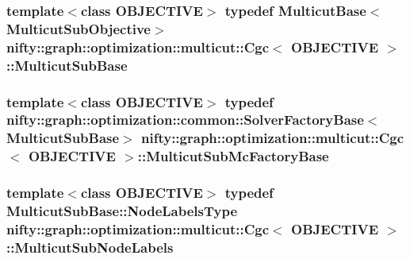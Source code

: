 \subsubsection[{Multicut\+Sub\+Base}]{\setlength{\rightskip}{0pt plus 5cm}template$<$class O\+B\+J\+E\+C\+T\+I\+V\+E$>$ typedef {\bf Multicut\+Base}$<${\bf Multicut\+Sub\+Objective}$>$ {\bf nifty\+::graph\+::optimization\+::multicut\+::\+Cgc}$<$ O\+B\+J\+E\+C\+T\+I\+V\+E $>$\+::{\bf Multicut\+Sub\+Base}}\label{classnifty_1_1graph_1_1optimization_1_1multicut_1_1Cgc_a9bd82569e6729554ef0a07ad57f2bd94}
\hypertarget{classnifty_1_1graph_1_1optimization_1_1multicut_1_1Cgc_a5516da27348db37b794d25628deb9e82}{}
\subsubsection[{Multicut\+Sub\+Mc\+Factory\+Base}]{\setlength{\rightskip}{0pt plus 5cm}template$<$class O\+B\+J\+E\+C\+T\+I\+V\+E$>$ typedef {\bf nifty\+::graph\+::optimization\+::common\+::\+Solver\+Factory\+Base}$<${\bf Multicut\+Sub\+Base}$>$ {\bf nifty\+::graph\+::optimization\+::multicut\+::\+Cgc}$<$ O\+B\+J\+E\+C\+T\+I\+V\+E $>$\+::{\bf Multicut\+Sub\+Mc\+Factory\+Base}}\label{classnifty_1_1graph_1_1optimization_1_1multicut_1_1Cgc_a5516da27348db37b794d25628deb9e82}
\hypertarget{classnifty_1_1graph_1_1optimization_1_1multicut_1_1Cgc_a8a87ee61f8ce21292822f91e1f71c8d3}{}
\subsubsection[{Multicut\+Sub\+Node\+Labels}]{\setlength{\rightskip}{0pt plus 5cm}template$<$class O\+B\+J\+E\+C\+T\+I\+V\+E$>$ typedef {\bf Multicut\+Sub\+Base\+::\+Node\+Labels\+Type} {\bf nifty\+::graph\+::optimization\+::multicut\+::\+Cgc}$<$ O\+B\+J\+E\+C\+T\+I\+V\+E $>$\+::{\bf Multicut\+Sub\+Node\+Labels}}\label{classnifty_1_1graph_1_1optimization_1_1multicut_1_1Cgc_a8a87ee61f8ce21292822f91e1f71c8d3}
\hypertarget{classnifty_1_1graph_1_1optimization_1_1multicut_1_1Cgc_a437e2332f586cdb3f4ee55e3cf1ea224}{}

